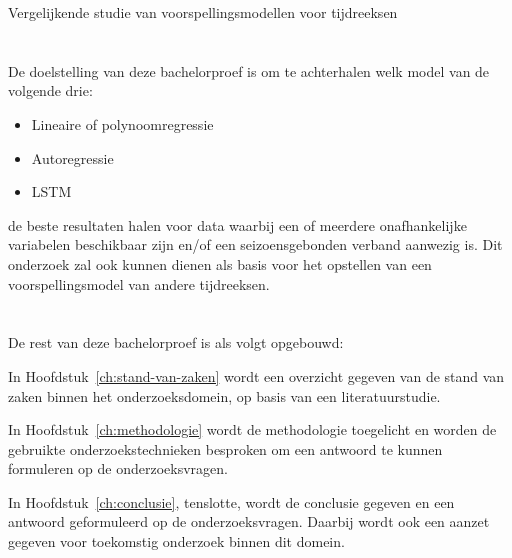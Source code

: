 Vergelijkende studie van voorspellingsmodellen voor tijdreeksen

\section{}
\label{sec:onderzoeksdoelstelling}

De doelstelling van deze bachelorproef is om te achterhalen welk model van de volgende drie:
\begin{itemize}
    \item Lineaire of polynoomregressie
    \item Autoregressie
    \item LSTM
\end{itemize}
 de beste resultaten halen voor data waarbij een of meerdere onafhankelijke variabelen beschikbaar zijn en/of een seizoensgebonden verband aanwezig is. Dit onderzoek zal ook kunnen dienen als basis voor het opstellen van een voorspellingsmodel van andere tijdreeksen. 

\section{}
\label{sec:opzet-bachelorproef}


De rest van deze bachelorproef is als volgt opgebouwd:

In Hoofdstuk~\ref{ch:stand-van-zaken} wordt een overzicht gegeven van de stand van zaken binnen het onderzoeksdomein, op basis van een literatuurstudie.

In Hoofdstuk~\ref{ch:methodologie} wordt de methodologie toegelicht en worden de gebruikte onderzoekstechnieken besproken om een antwoord te kunnen formuleren op de onderzoeksvragen.


In Hoofdstuk~\ref{ch:conclusie}, tenslotte, wordt de conclusie gegeven en een antwoord geformuleerd op de onderzoeksvragen. Daarbij wordt ook een aanzet gegeven voor toekomstig onderzoek binnen dit domein.